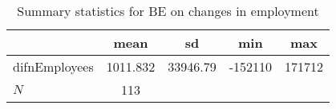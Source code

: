 \begin{table}[htbp]\centering
\def\sym#1{\ifmmode^{#1}\else\(^{#1}\)\fi}
\caption{Summary statistics for BE on changes in employment}
\begin{tabular}{l*{1}{cccc}}
\hline\hline
            &        mean&          sd&         min&         max\\
\hline
difnEmployees&    1011.832&    33946.79&     -152110&      171712\\
\hline
\(N\)       &         113&            &            &            \\
\hline\hline
\end{tabular}
\end{table}
